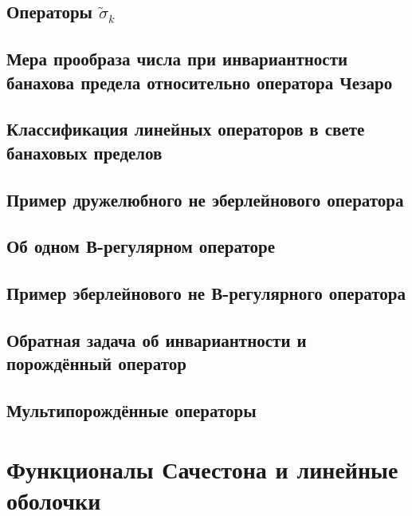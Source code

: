 \documentclass[12pt,a4paper,openbib]{report}
\theoremstyle{definition}
\begin{document}
	\section{Операторы $\tilde\sigma_k$}
	

	\section{Мера прообраза числа при инвариантности банахова предела относительно оператора Чезаро}
	


	\section{Классификация линейных операторов в свете банаховых пределов}
	

	\section{Пример дружелюбного не эберлейнового оператора}
	

	\section{Об одном В-регулярном операторе}
	

	\section{Пример эберлейнового не В-регулярного оператора}
	

	\section{Обратная задача об инвариантности и порождённый оператор}
	

	\section{Мультипорождённые операторы}
	


\chapter{Функционалы Сачестона и линейные оболочки}
\end{document}
